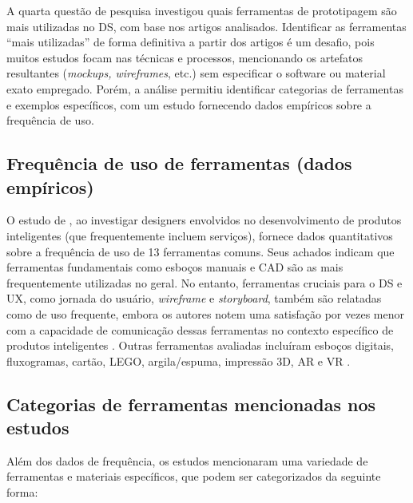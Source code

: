 A quarta questão de pesquisa investigou quais ferramentas de prototipagem são mais utilizadas no DS, com base nos artigos analisados. Identificar as ferramentas ``mais utilizadas'' de forma definitiva a partir dos artigos é um desafio, pois muitos estudos focam nas técnicas e processos, mencionando os artefatos resultantes (\textit{mockups, wireframes}, etc.) sem especificar o software ou material exato empregado. Porém, a análise permitiu identificar categorias de ferramentas e exemplos específicos, com um estudo  fornecendo dados empíricos sobre a frequência de uso.

\subsection{Frequência de uso de ferramentas (dados empíricos)}

O estudo de , ao investigar designers envolvidos no desenvolvimento de produtos inteligentes (que frequentemente incluem serviços), fornece dados quantitativos sobre a frequência de uso de 13 ferramentas comuns. Seus achados indicam que ferramentas fundamentais como esboços manuais e CAD são as mais frequentemente utilizadas no geral. No entanto, ferramentas cruciais para o DS e UX, como jornada do usuário, \textit{wireframe} e \textit{storyboard}, também são relatadas como de uso frequente, embora os autores notem uma satisfação por vezes menor com a capacidade de comunicação dessas ferramentas no contexto específico de produtos inteligentes \cite{wang2023smartproducts}. Outras ferramentas avaliadas incluíram esboços digitais, fluxogramas, cartão, LEGO, argila/espuma, impressão 3D, AR e VR \cite{wang2023smartproducts}.

\subsection{Categorias de ferramentas mencionadas nos estudos}

Além dos dados de frequência, os estudos mencionaram uma variedade de ferramentas e materiais específicos, que podem ser categorizados da seguinte forma:

